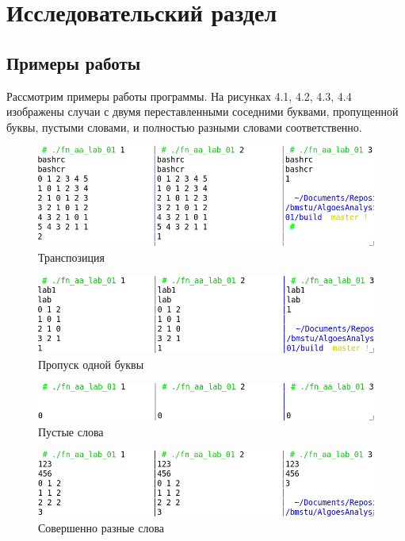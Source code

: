 \chapter{Исследовательский раздел}
\label{cha:research}

\section{Примеры работы}
Рассмотрим примеры работы программы. На рисунках 4.1, 4.2, 4.3, 4.4 изображены случаи с двумя переставленными соседними буквами, пропущенной буквы, пустыми словами, и полностью разными словами соответственно.

\begin{figure}[H]
    \centering
    \includegraphics[scale=0.5]{./pics/t1.png}
    \caption{Транспозиция}
\end{figure}
\begin{figure}[H]
    \centering
    \includegraphics[scale=0.5]{./pics/t2.png}
    \caption{Пропуск одной буквы}
\end{figure}
\begin{figure}[H]
    \centering
    \includegraphics[scale=0.5]{./pics/t3.png}
    \caption{Пустые слова}
\end{figure}
\begin{figure}[H]
    \centering
    \includegraphics[scale=0.5]{./pics/t4.png}
    \caption{Совершенно разные слова}
\end{figure}

